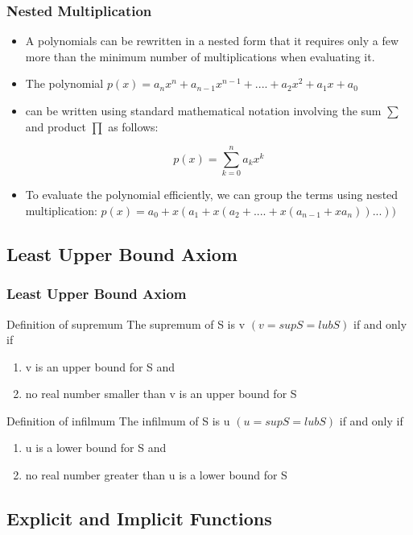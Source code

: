 \documentclass[notheorems,mathserif,table,compress]{beamer}  %
\begin{document}
\begin{frame}
  \frametitle{Nested Multiplication}
  \begin{itemize}
  \item A polynomials can be rewritten in a nested  form  that it  requires  only a few more  than  the minimum  number of multiplications  when    evaluating it.
  \item The polynomial $p(x)=a_nx^n+a_{n-1}x^{n-1}+....+a_2x^2+a_1x+a_0$  
  \item can  be written  using  standard  mathematical  notation involving  the  sum $\sum$ and  product $\prod$ as follows:

 \begin{displaymath}
 p(x)=\sum_{k=0}^n a_kx^k 
 \end{displaymath}

  \item To evaluate  the  polynomial  efficiently, we can group  the  terms  using  nested  multiplication: $p(x)=a_0+x(a_1+x(a_2+....+x(a_{n-1}+xa_n))...))$
  \end{itemize}
\end{frame}

\subsection{Least Upper Bound Axiom}
\begin{frame}
  \frametitle{Least Upper Bound Axiom}
  \begin{description}
  \item Definition  of  supremum
   The supremum of S is v $(v=supS=lubS)$ if  and only if
    \begin{enumerate}
    \item v is  an upper bound for S and
    \item no real  number smaller than v is  an upper bound for S
    \end{enumerate}
 \item Definition  of  infilmum 
  The infilmum of S is u $(u=supS=lubS)$ if  and only if
     \begin{enumerate}
     \item  u is a lower bound for S and
     \item no  real  number  greater  than  u is  a lower bound for S
     \end{enumerate}
   \end{description}
\end{frame}

\subsection{Explicit and Implicit Functions}
\end{document}
